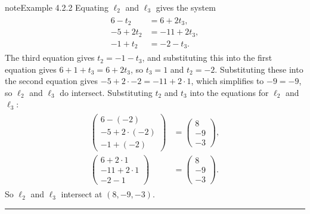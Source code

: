 \documentclass[letterpaper,10pt,english]{jupyterBook}
\begin{document}
\begin{sphinxadmonition}{note}{Example 4.2.2}
\sphinxAtStartPar
Equating \(\ell_2\) and \(\ell_3\) gives the system
\begin{equation*}
\begin{split} \begin{align*}
    6 - t_2 &= 6 + 2t_3, \\
    -5 + 2t_2 &= -11 + 2t_3, \\
    -1 + t_2 &= -2 - t_3.
\end{align*} \end{split}
\end{equation*}
\sphinxAtStartPar
The third equation gives \(t_2 = -1 - t_3\), and substituting this into the first equation gives \(6 + 1 + t_3 = 6 + 2t_3\), so \(t_3 = 1\) and \(t_2 = -2\). Substituting these into the second equation gives \(-5 + 2 \cdot -2 = -11 + 2 \cdot 1\), which simplifies to \(-9 = -9\), so \(\ell_2\) and \(\ell_3\) do intersect. Substituting \(t_2\) and \(t_3\) into the equations for \(\ell_2\) and \(\ell_3\):
\begin{equation*}
\begin{split} \begin{align*}
    \begin{pmatrix} 6 - (-2) \\ -5 + 2 \cdot (-2) \\ -1 + (-2) \end{pmatrix} &= \begin{pmatrix} 8 \\ -9 \\ -3 \end{pmatrix}, \\
    \begin{pmatrix} 6 + 2 \cdot 1 \\ -11 + 2 \cdot 1 \\ -2 - 1 \end{pmatrix} &= \begin{pmatrix} 8 \\ -9 \\ -3 \end{pmatrix}.
\end{align*} \end{split}
\end{equation*}
\sphinxAtStartPar
So \(\ell_2\) and \(\ell_3\) intersect at \((8, -9, -3)\).
\end{sphinxadmonition}


\bigskip\hrule\bigskip


\ignorespaces 
\end{document}

